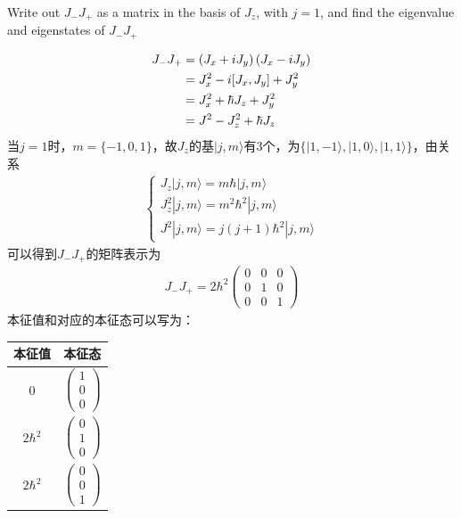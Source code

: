 \documentclass[UTF8,12pt]{article} %
\makeatletter
\newenvironment{proof}[1][\protect\proofname]{\par
\normalfont\topsep6\p@\@plus6\p@\relax
\trivlist
\itemindent\parindent
\item[\hskip\labelsep
\scshape
#1]\ignorespaces
}{%
\endtrivlist\@endpefalse
}
\renewcommand{\proofname}{\it{Solution}}
\makeatother
\begin{document}
\begin{exercise}{}{}
Write out $J_- J_+$ as a matrix in the basis of $J_z$, with $j=1$, and find the eigenvalue and eigenstates of $J_-J_+$
\end{exercise}

\begin{proof}[解]
\begin{align}
J_-J_+ &= \left(J_x + iJ_y\right)\left(J_x - iJ_y\right) \\
&= J_x^2 -i[J_x, J_y] + J_y^2 \notag\\
&= J_x^2 + \hbar J_z + J_y^2 \notag\\
&= J^2 - J_z^2 + \hbar J_z
\end{align}
当$j=1$时，$m = \{-1,0,1\}$，故$J_z$的基$|j,m\rangle$有3个，为$\{|1,-1\rangle, |1,0\rangle, |1,1\rangle\}$，由关系
\begin{align*}
\begin{cases}J_z |j,m\rangle = m\hbar |j,m\rangle \\
J_z^2 |j,m\rangle = m^2\hbar^2 |j,m\rangle \\
J^2 |j,m\rangle = j(j+1)\hbar^2 |j,m\rangle\end{cases}
\end{align*}
可以得到$J_-J_+$的矩阵表示为
\begin{align}
J_-J_+ = 2\hbar^2\begin{pmatrix}0&0&0\\0&1&0\\0&0&1\end{pmatrix}
\end{align}
本征值和对应的本征态可以写为：
\begin{table}[H]
\begin{center}
\begin{tabular}{|c|c|}\hline
本征值&本征态\\ \hline
$0$ & $\begin{pmatrix}1\\0\\0\end{pmatrix}$ \\ \hline
$2\hbar^2$ & $\begin{pmatrix}0\\1\\0\end{pmatrix}$ \\ \hline
$2\hbar^2$ & $\begin{pmatrix}0\\0\\1\end{pmatrix}$ \\ \hline
\end{tabular}
\end{center}
\end{table}
\end{proof}
\end{document}
